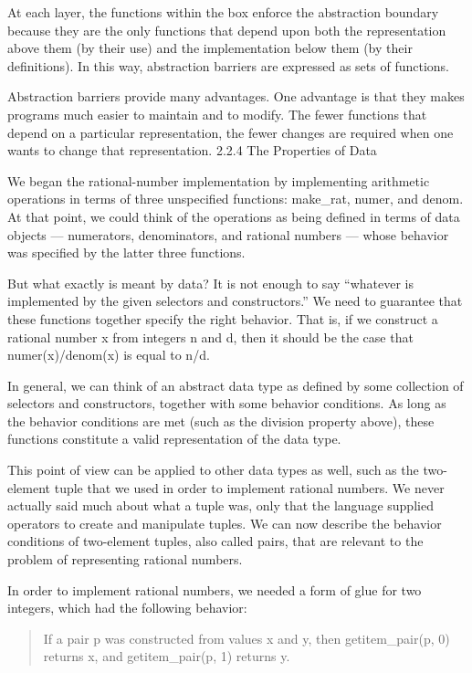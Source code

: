 \documentclass[letterpaper,10pt,dvipdfmx]{sphinxmanual}
\begin{document}
At each layer, the functions within the box enforce the abstraction boundary because they are the only functions that depend upon both the representation above them (by their use) and the implementation below them (by their definitions). In this way, abstraction barriers are expressed as sets of functions.

Abstraction barriers provide many advantages. One advantage is that they makes programs much easier to maintain and to modify. The fewer functions that depend on a particular representation, the fewer changes are required when one wants to change that representation.
2.2.4   The Properties of Data

We began the rational-number implementation by implementing arithmetic operations in terms of three unspecified functions: make\_rat, numer, and denom. At that point, we could think of the operations as being defined in terms of data objects --- numerators, denominators, and rational numbers --- whose behavior was specified by the latter three functions.

But what exactly is meant by data? It is not enough to say ``whatever is implemented by the given selectors and constructors.'' We need to guarantee that these functions together specify the right behavior. That is, if we construct a rational number x from integers n and d, then it should be the case that numer(x)/denom(x) is equal to n/d.

In general, we can think of an abstract data type as defined by some collection of selectors and constructors, together with some behavior conditions. As long as the behavior conditions are met (such as the division property above), these functions constitute a valid representation of the data type.

This point of view can be applied to other data types as well, such as the two-element tuple that we used in order to implement rational numbers. We never actually said much about what a tuple was, only that the language supplied operators to create and manipulate tuples. We can now describe the behavior conditions of two-element tuples, also called pairs, that are relevant to the problem of representing rational numbers.

In order to implement rational numbers, we needed a form of glue for two integers, which had the following behavior:
\begin{quote}

If a pair p was constructed from values x and y, then getitem\_pair(p, 0) returns x, and getitem\_pair(p, 1) returns y.
\end{quote}
\end{document}
